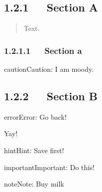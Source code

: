 \documentclass[letterpaper,10pt,english]{sphinxmanual}
\begin{document}
\begin{sphinxVerbatim}[commandchars=\\\{\},numbers=left,firstnumber=10,stepnumber=1]
 
       

        
       
\end{sphinxVerbatim}


\subsection{1.2.1   Section A}
\label{\detokenize{page3:section-a}}\begin{quote}

Text.
\end{quote}


\subsubsection{1.2.1.1   Section a}
\label{\detokenize{page3:id1}}
\begin{sphinxadmonition}{caution}{Caution:}
I am moody.
\end{sphinxadmonition}


\subsection{1.2.2   Section B}
\label{\detokenize{page3:section-b}}
\begin{sphinxadmonition}{error}{Error:}
Go back!
\end{sphinxadmonition}

\begin{sphinxShadowBox}

Yay!
\end{sphinxShadowBox}

\begin{sphinxadmonition}{hint}{Hint:}
Save first!
\end{sphinxadmonition}

\begin{sphinxadmonition}{important}{Important:}
Do this!
\end{sphinxadmonition}

\begin{sphinxadmonition}{note}{Note:}
Buy milk
\end{sphinxadmonition}
\end{document}
